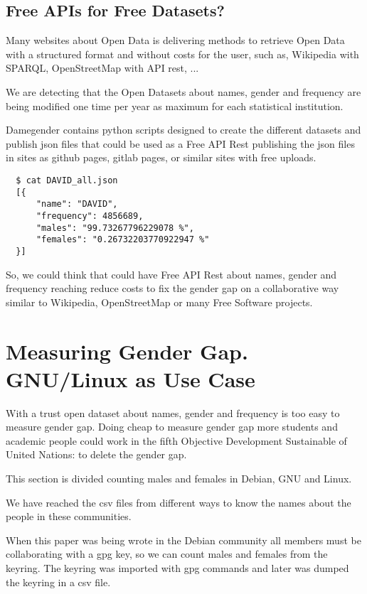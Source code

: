\documentclass[a4paper]{article}
\begin{document}
\subsection{Free APIs for Free Datasets?}
\label{sec:freeapis}

Many websites about Open Data is delivering methods to retrieve Open
Data with a structured format and without costs for the user, such as,
Wikipedia with SPARQL, OpenStreetMap with API rest, ...

We are detecting that the Open Datasets about names, gender and
frequency are being modified one time per year as maximum for each
statistical institution.

Damegender contains python scripts designed to create the
different datasets and publish json files that could be used as a Free
API Rest publishing the json files in sites as github pages, gitlab
pages, or similar sites with free uploads.

\begin{verbatim}
  $ cat DAVID_all.json
  [{
      "name": "DAVID",
      "frequency": 4856689,
      "males": "99.73267796229078 %",
      "females": "0.26732203770922947 %"
  }]
\end{verbatim}

So, we could think that could have Free API Rest about names, gender
and frequency reaching reduce costs to fix the gender gap on a
collaborative way similar to Wikipedia, OpenStreetMap or many Free
Software projects.

\section{Measuring Gender Gap. GNU/Linux as Use Case}
\label{sec:measuring}

With a trust open dataset about names, gender and frequency is too
easy to measure gender gap. Doing cheap to measure gender gap more
students and academic people could work in the fifth Objective
Development Sustainable of United Nations: to delete the gender gap.

This section is divided counting males and females in Debian, GNU and
Linux.

We have reached the csv files from different ways to know the names
about the people in these communities.

When this paper was being wrote in the Debian community all members
must be collaborating with a gpg key, so we can count males and females
from the keyring. The keyring was imported with gpg commands and later
was dumped the keyring in a csv file.
\end{document}
